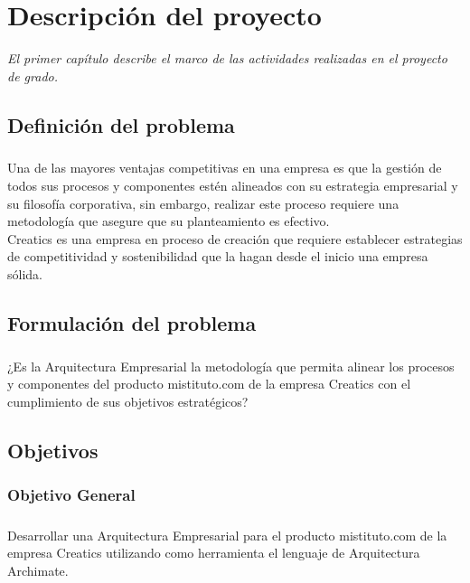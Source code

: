 \chapter{Descripción del proyecto}
\label{chap:Problema}
\textit{El primer capítulo describe el marco de las actividades realizadas en el proyecto de grado.}
\vfill
\minitoc
\cleardoublepage

\section{Definición del problema}
  \paragraph*{}
  Una de las mayores ventajas competitivas en una empresa es que la gestión de todos sus procesos y componentes estén alineados con su estrategia empresarial y su filosofía corporativa, sin embargo, realizar este proceso requiere una metodología que asegure que su planteamiento es efectivo. \\
  Creatics es una empresa en proceso de creación que requiere establecer estrategias de competitividad y sostenibilidad que la hagan desde el inicio una empresa sólida.

\section{Formulación del problema}
  \paragraph*{}
  ¿Es la Arquitectura Empresarial la metodología que permita alinear los procesos y componentes del producto mistituto.com de la empresa Creatics con el cumplimiento de sus objetivos estratégicos?

\section{Objetivos}
  \subsection{Objetivo General}
    \paragraph*{}
    Desarrollar una Arquitectura Empresarial para el producto mistituto.com de la empresa Creatics utilizando como herramienta el lenguaje de Arquitectura Archimate.

